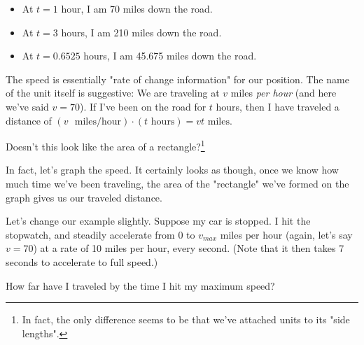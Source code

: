 \documentclass{book}
\begin{document}
\begin{itemize}
\item At $t = 1$ hour, I am 70 miles down the road.
\item At $t = 3$ hours, I am 210 miles down the road.
\item At $t = 0.6525$ hours, I am 45.675 miles down the road.
\end{itemize}

The speed is essentially "rate of change information" for our position. The name of the unit itself is suggestive: We are traveling at $v$ miles \emph{per hour} (and here we've said $v = 70$). If I've been on the road for $t$ hours, then I have traveled a distance of $(v \text{ }\text{miles}/\text{hour}) \cdot (t\text{ hours}) = vt\text{ miles}$.

Doesn't this look like the area of a rectangle?\footnote{In fact, the only difference seems to be that we've attached units to its "side lengths".}

In fact, let's graph the speed. It certainly looks as though, once we know how much time we've been traveling, the area of the "rectangle" we've formed on the graph gives us our traveled distance.








Let's change our example slightly. Suppose my car is stopped. I hit the stopwatch, and steadily accelerate from $0$ to $v_{max}$ miles per hour (again, let's say $v = 70$) at a rate of 10 miles per hour, every second. (Note that it then takes 7 seconds to accelerate to full speed.) 

How far have I traveled by the time I hit my maximum speed? %
\end{document}
